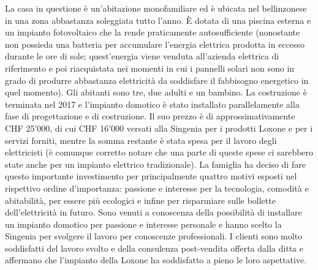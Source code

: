 La casa in questione è un’abitazione monofamiliare ed è ubicata nel bellinzonese in una zona abbastanza soleggiata tutto l’anno. È dotata di una piscina esterna e un impianto fotovoltaico che la rende praticamente autosufficiente (nonostante non possieda una batteria per accumulare l’energia elettrica prodotta in eccesso durante le ore di sole; quest’energia viene venduta all’azienda elettrica di riferimento e poi riacquistata nei momenti in cui i pannelli solari non sono in grado di produrre abbastanza elettricità da soddisfare il fabbisogno energetico in quel momento). Gli abitanti sono tre, due adulti e un bambino. La costruzione è terminata nel 2017 e l’impianto domotico è stato installato parallelamente alla fase di progettazione e di costruzione. Il suo prezzo è di approssimativamente CHF 25'000, di cui CHF 16'000 versati alla Singenia per i prodotti Loxone e per i servizi forniti, mentre la somma restante è stata spesa per il lavoro degli elettricisti (è comunque corretto notare che una parte di queste spese ci sarebbero state anche per un impianto elettrico tradizionale). La famiglia ha deciso di fare questo importante investimento per principalmente quattro motivi esposti nel rispettivo ordine d’importanza: passione e interesse per la tecnologia, comodità e abitabilità, per essere più ecologici e infine per risparmiare sulle bollette dell’elettricità in futuro. Sono venuti a conoscenza della possibilità di installare un impianto domotico per passione e interesse personale e hanno scelto la Singenia per svolgere il lavoro per conoscenze professionali. I clienti sono molto soddisfatti del lavoro svolto e della consulenza post-vendita offerta dalla ditta e affermano che l’impianto della Loxone ha soddisfatto a pieno le loro aspettative. 